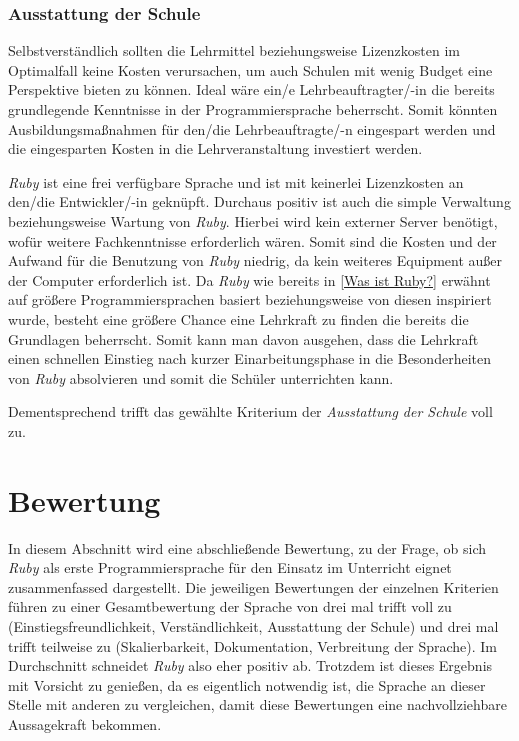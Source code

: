 \documentclass[12pt,DIV=14, version=first, BCOR=10mm,a4paper,twoside,parskip=half-,headsepline,headinclude]{scrartcl}
\begin{document}
\subsubsection{Ausstattung der Schule}
\begin{flushleft}
Selbstverständlich sollten die Lehrmittel beziehungsweise Lizenzkosten im Optimalfall keine Kosten verursachen, um auch Schulen mit wenig Budget eine Perspektive bieten zu können. Ideal wäre ein/e Lehrbeauftragter/-in die bereits grundlegende Kenntnisse in der Programmiersprache beherrscht. Somit könnten Ausbildungsmaßnahmen für den/die Lehrbeauftragte/-n eingespart werden und die eingesparten Kosten in die Lehrveranstaltung investiert werden.

\textit{\glqq Ruby\grqq} ist eine frei verfügbare Sprache und ist mit keinerlei Lizenzkosten an den/die Entwickler/-in geknüpft. Durchaus positiv ist auch die simple Verwaltung beziehungsweise Wartung von \textit{\glqq Ruby\grqq}. Hierbei wird kein externer Server benötigt, wofür weitere Fachkenntnisse erforderlich wären. Somit sind die Kosten und der Aufwand für die Benutzung von \textit{\glqq Ruby\grqq} niedrig, da kein weiteres Equipment außer der Computer erforderlich ist. Da \textit{\glqq Ruby\grqq} wie bereits in \ref{Was ist Ruby?} erwähnt auf größere Programmiersprachen basiert beziehungsweise von diesen inspiriert wurde, besteht eine größere Chance eine Lehrkraft zu finden die bereits die Grundlagen beherrscht. Somit kann man davon ausgehen, dass die Lehrkraft einen schnellen Einstieg nach kurzer Einarbeitungsphase in die Besonderheiten von \textit{\glqq Ruby\grqq} absolvieren und somit die Schüler unterrichten kann.

Dementsprechend trifft das gewählte Kriterium der \textit{Ausstattung der Schule} voll zu.
\end{flushleft}

\section{Bewertung}
\begin{flushleft}
In diesem Abschnitt wird eine abschließende Bewertung, zu der Frage, ob sich \textit{\glqq Ruby\grqq} als erste Programmiersprache für den Einsatz im Unterricht eignet zusammenfassed dargestellt. Die jeweiligen Bewertungen der einzelnen Kriterien führen zu einer Gesamtbewertung der Sprache von drei mal
{\glqq trifft voll zu\grqq} (Einstiegsfreundlichkeit, Verständlichkeit, Ausstattung der Schule) und drei mal {\glqq trifft teilweise zu\grqq} (Skalierbarkeit, Dokumentation, Verbreitung der Sprache). Im Durchschnitt schneidet \textit{\glqq Ruby\grqq} also eher positiv ab.
Trotzdem ist dieses Ergebnis mit Vorsicht zu genießen, da es eigentlich notwendig ist, die Sprache an dieser Stelle mit anderen zu vergleichen, damit diese Bewertungen eine nachvollziehbare Aussagekraft bekommen.
\end{flushleft}
\end{document}
